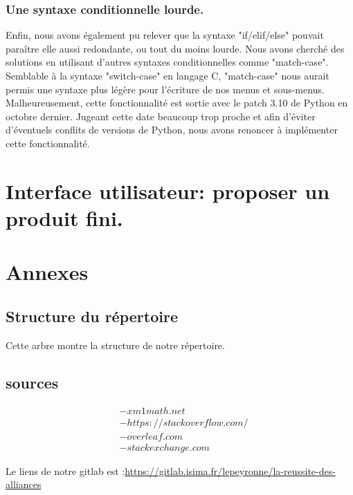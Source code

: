 \documentclass[10pt,a4paper,french,titlepage]{article}
\theoremstyle{definition}
\begin{document}
\subsubsection{Une syntaxe conditionnelle lourde.}
Enfin, nous avons également pu relever que la syntaxe "if/elif/else" pouvait paraître elle aussi redondante, ou tout du moins lourde. Nous avons cherché des solutions en utilisant d'autres syntaxes conditionnelles comme "match-case". Semblable à la syntaxe "switch-case" en langage C, "match-case" nous aurait permis une syntaxe plus légère pour l'écriture de nos menus et sous-menus. Malheureusement, cette fonctionnalité est sortie avec le patch 3.10 de Python en octobre dernier. Jugeant cette date beaucoup trop proche et afin d'éviter d'éventuels conflits de versions de Python, nous avons renoncer à implémenter cette fonctionnalité.
\section{Interface utilisateur: proposer un produit fini.}
\section{Annexes}
\subsection{Structure du répertoire}\label{arbre}

Cette arbre montre la structure de notre répertoire.\\
\hspace*{\fill}
%
     \hspace*{\fill}
\subsection{sources}
\begin{align*}
&-xm1math.net\\
&-https://stackoverflow.com/\\
&-overleaf.com\\
&-stackexchange.com
\end{align*}



Le liens de notre gitlab est :\url{https://gitlab.isima.fr/lepeyronne/la-reussite-des-alliances}
\end{document}
